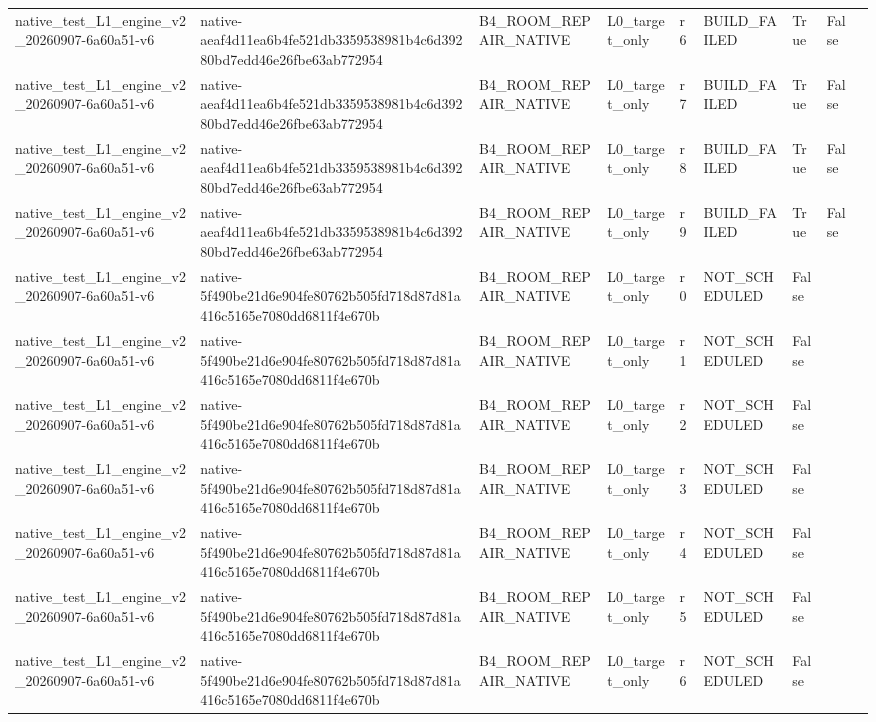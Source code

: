 \begin{tabular}{lllllllll}
native\_test\_L1\_engine\_v2\_20260907-6a60a51-v6 & native-aeaf4d11ea6b4fe521db3359538981b4c6d39280bd7edd46e26fbe63ab772954 & B4\_ROOM\_REPAIR\_NATIVE & L0\_target\_only & r6 & BUILD\_FAILED & True & False &  \\
native\_test\_L1\_engine\_v2\_20260907-6a60a51-v6 & native-aeaf4d11ea6b4fe521db3359538981b4c6d39280bd7edd46e26fbe63ab772954 & B4\_ROOM\_REPAIR\_NATIVE & L0\_target\_only & r7 & BUILD\_FAILED & True & False &  \\
native\_test\_L1\_engine\_v2\_20260907-6a60a51-v6 & native-aeaf4d11ea6b4fe521db3359538981b4c6d39280bd7edd46e26fbe63ab772954 & B4\_ROOM\_REPAIR\_NATIVE & L0\_target\_only & r8 & BUILD\_FAILED & True & False &  \\
native\_test\_L1\_engine\_v2\_20260907-6a60a51-v6 & native-aeaf4d11ea6b4fe521db3359538981b4c6d39280bd7edd46e26fbe63ab772954 & B4\_ROOM\_REPAIR\_NATIVE & L0\_target\_only & r9 & BUILD\_FAILED & True & False &  \\
native\_test\_L1\_engine\_v2\_20260907-6a60a51-v6 & native-5f490be21d6e904fe80762b505fd718d87d81a416c5165e7080dd6811f4e670b & B4\_ROOM\_REPAIR\_NATIVE & L0\_target\_only & r0 & NOT\_SCHEDULED & False &  &  \\
native\_test\_L1\_engine\_v2\_20260907-6a60a51-v6 & native-5f490be21d6e904fe80762b505fd718d87d81a416c5165e7080dd6811f4e670b & B4\_ROOM\_REPAIR\_NATIVE & L0\_target\_only & r1 & NOT\_SCHEDULED & False &  &  \\
native\_test\_L1\_engine\_v2\_20260907-6a60a51-v6 & native-5f490be21d6e904fe80762b505fd718d87d81a416c5165e7080dd6811f4e670b & B4\_ROOM\_REPAIR\_NATIVE & L0\_target\_only & r2 & NOT\_SCHEDULED & False &  &  \\
native\_test\_L1\_engine\_v2\_20260907-6a60a51-v6 & native-5f490be21d6e904fe80762b505fd718d87d81a416c5165e7080dd6811f4e670b & B4\_ROOM\_REPAIR\_NATIVE & L0\_target\_only & r3 & NOT\_SCHEDULED & False &  &  \\
native\_test\_L1\_engine\_v2\_20260907-6a60a51-v6 & native-5f490be21d6e904fe80762b505fd718d87d81a416c5165e7080dd6811f4e670b & B4\_ROOM\_REPAIR\_NATIVE & L0\_target\_only & r4 & NOT\_SCHEDULED & False &  &  \\
native\_test\_L1\_engine\_v2\_20260907-6a60a51-v6 & native-5f490be21d6e904fe80762b505fd718d87d81a416c5165e7080dd6811f4e670b & B4\_ROOM\_REPAIR\_NATIVE & L0\_target\_only & r5 & NOT\_SCHEDULED & False &  &  \\
native\_test\_L1\_engine\_v2\_20260907-6a60a51-v6 & native-5f490be21d6e904fe80762b505fd718d87d81a416c5165e7080dd6811f4e670b & B4\_ROOM\_REPAIR\_NATIVE & L0\_target\_only & r6 & NOT\_SCHEDULED & False &  &  \\

\end{tabular}
